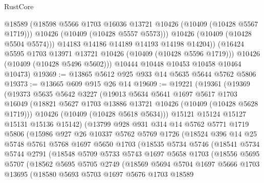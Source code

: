 \begin{lexlean}{RustCore}
\begin{coremodule}
                @18589
                (@18598 @5566 @1703 @16036 @13721 @10426 (@10409 (@10428 @5567 @1719)))
                @10426
                (@10409 (@10428 @5557 @5573)))
              @10426
              (@10409 (@10428 @5504 @5574)))
            @14183
            @14186
            @14189
            @14193
            @14198
            @14204))
        (@16424 @5595 @1703 @13971 @13721 @10426 (@10409 (@10428 @5596 @1719)))
        @10426
        (@10409 (@10428 @5496 @5602)))
      @10444
      @10448
      @10453
      @10458
      @10464
      @10473)
@19369 := @13865 @5612 @925 @933 @14 @5635 @5644 @5762 @5806
@19373 := @13665 @609 @915 @26 @14
@19609 := @19221
    (@19361
      (@19369
        (@19373
          @5635
          @5642
          @3227
          (@19013
            @5634
            @5641
            @1697
            @5617
            @1703
            @16049
            (@18821 @5627 @1703 @13886 @13721 @10426 (@10409 (@10428 @5628 @1719)))
            @10426
            (@10409 (@10428 @5618 @5634)))
          @15121
          @15124
          @15127
          @15131
          @15136
          @15142)
        (@13799
          @928
          @931
          @314
          @14
          @5762
          @5771
          @1719
          @5806
          (@15986
            @927
            @26
            @10337
            @5762
            @5769
            @1726
            (@18524
              @396
              @14
              @25
              @5748
              @5761
              @5768
              @1697
              @5650
              @1703
              (@18535
                @5734
                @5746
                (@18541
                  @5734
                  @5744
                  @2791
                  (@18548
                    @5709
                    @5733
                    @5743
                    @1697
                    @5658
                    @1703
                    (@18556
                      @5695
                      @5707
                      (@18562
                        @5695
                        @5705
                        @2749
                        (@18569
                          @5694
                          @5704
                          @1697
                          @5666
                          @1703
                          @13695
                          (@18580
                            @5693
                            @5703
                            @1697
                            @5676
                            @1703
                            @18589

\end{coremodule}
\end{lexlean}
